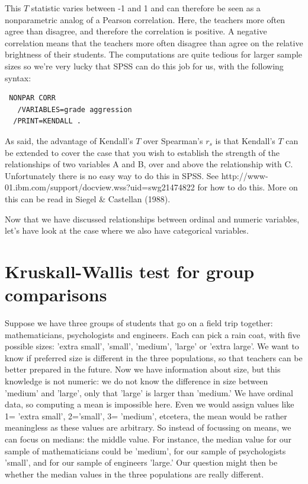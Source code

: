 \documentclass[]{report}\usepackage[]{graphicx}\usepackage[]{color}
\begin{document}
This $T$ statistic varies between -1 and 1 and can therefore be seen as a nonparametric analog of a Pearson correlation. Here, the teachers more often agree than disagree, and therefore the correlation is positive. A negative correlation means that the teachers more often disagree than agree on the relative brightness of their students. 
The computations are quite tedious for larger sample sizes so we're very lucky that SPSS can do this job for us, with the following syntax:


 \begin{verbatim}
 NONPAR CORR 
   /VARIABLES=grade aggression 
  /PRINT=KENDALL .
 \end{verbatim}


As said, the advantage of Kendall's $T$ over Spearman's $r_s$ is that Kendall's $T$ can be extended to cover the case that you wish to establish the strength of the relationships of two variables A and B, over and above the relationship with C. Unfortunately there is no easy way to do this in SPSS. See http://www-01.ibm.com/support/docview.wss?uid=swg21474822 for how to do this. More on this can be read in Siegel \& Castellan (1988).

        
Now that we have discussed relationships between ordinal and numeric variables, let's have look at the case where we also have categorical variables.


\section{Kruskall-Wallis test for group comparisons}


Suppose we have three groups of students that go on a field trip together: mathematicians, psychologists and engineers. Each can pick a rain coat, with five possible sizes: 'extra small', 'small', 'medium', 'large' or 'extra large'. We want to know if preferred size is different in the three populations, so that teachers can be better prepared in the future. Now we have information about size, but this knowledge is not numeric: we do not know the difference in size between 'medium' and 'large', only that 'large' is larger than 'medium.' We have ordinal data, so computing a mean is impossible here. Even we would assign values like 1= 'extra small', 2='small', 3= 'medium', etcetera, the mean would be rather meaningless as these values are arbitrary. So instead of focussing on means, we can focus on medians: the middle value. For instance, the median value for our sample of mathematicians could be 'medium', for our sample of psychologists 'small', and for our sample of engineers 'large.' Our question might then be whether the median values in the three populations are really different. 
\end{document}
